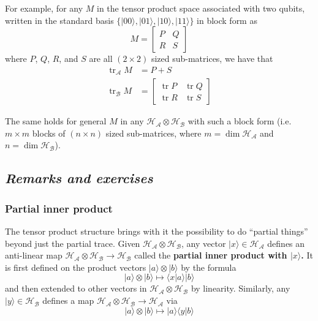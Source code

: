 \documentclass[fleqn]{article}
\begin{document}
For example, for any \(M\) in the tensor product space associated with two qubits, written in the standard basis \(\{|00\rangle,|01\rangle,|10\rangle,|11\rangle\}\) in block form as
\[
  M =
  \left[
    \begin{array}{c|c}
      P & Q
    \\\hline
      R & S
    \end{array}
  \right]
\]
where \(P\), \(Q\), \(R\), and \(S\) are all \((2\times 2)\) sized sub-matrices, we have that
\[
  \begin{aligned}
    \operatorname{tr}_{\mathcal{A}} M
    &= P+S
  \\\operatorname{tr}_{\mathcal{B}} M
    &=
  \left[
    \begin{array}{c|c}
      \operatorname{tr}P & \operatorname{tr}Q
    \\\hline
      \operatorname{tr}R & \operatorname{tr}S
    \end{array}
  \right]
  \end{aligned}
\]

The same holds for general \(M\) in any \(\mathcal{H}_{\mathcal{A}}\otimes\mathcal{H}_{\mathcal{B}}\) with such a block form (i.e.~\(m\times m\) blocks of \((n\times n)\) sized sub-matrices, where \(m=\dim\mathcal{H}_{\mathcal{A}}\) and \(n=\dim\mathcal{H}_{\mathcal{B}}\)).

\hypertarget{remarks-and-exercises-7}{%
\subsection{\texorpdfstring{\emph{Remarks and exercises}}{Remarks and exercises}}\label{remarks-and-exercises-7}}

\hypertarget{partial-inner-product}{%
\subsubsection{Partial inner product}\label{partial-inner-product}}

The tensor product structure brings with it the possibility to do ``partial things'' beyond just the partial trace.
Given \(\mathcal{H}_{\mathcal{A}}\otimes\mathcal{H}_{\mathcal{B}}\), any vector \(|x\rangle\in\mathcal{H}_{\mathcal{A}}\) defines an anti-linear map \(\mathcal{H}_{\mathcal{A}}\otimes\mathcal{H}_{\mathcal{B}}\to\mathcal{H}_{\mathcal{B}}\) called the \textbf{partial inner product with \(|x\rangle\).}
It is first defined on the product vectors \(|a\rangle\otimes|b\rangle\) by the formula
\[
  |a\rangle\otimes|b\rangle
  \longmapsto \langle x|a\rangle|b\rangle
\]
and then extended to other vectors in \(\mathcal{H}_{\mathcal{A}}\otimes\mathcal{H}_{\mathcal{B}}\) by linearity.
Similarly, any \(|y\rangle\in\mathcal{H}_{\mathcal{B}}\) defines a map \(\mathcal{H}_{\mathcal{A}}\otimes\mathcal{H}_{\mathcal{B}}\to\mathcal{H}_{\mathcal{A}}\) via
\[
  |a\rangle\otimes|b\rangle
  \longmapsto |a\rangle\langle y|b\rangle
\]
\end{document}
